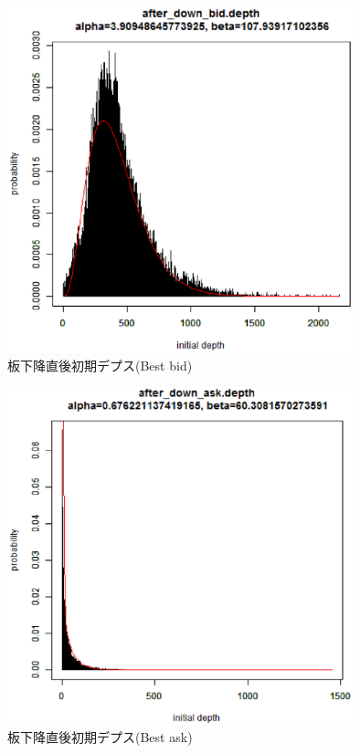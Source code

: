 \documentclass[a4j,papersize,disablejfam,slide,14pt]{jsarticle}
\begin{document}
    \begin{figure}[H]
        \begin{center}
    	\includegraphics[clip,width = 10.0cm]{graphics/after_down_bid.eps}
        \end{center}
        \caption{板下降直後初期デプス({\rm Best bid})}
    \end{figure}
    \begin{figure}[H]
        \begin{center}
    	\includegraphics[clip,width = 10.0cm]{graphics/after_down_ask.eps}
        \end{center}
        \caption{板下降直後初期デプス({\rm Best ask})}
    \end{figure}
    
\end{document}
